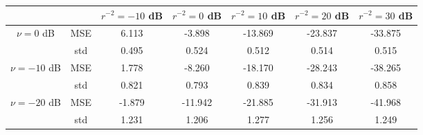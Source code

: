 \begin{tabular}{ccccccc}
\toprule
             &     &  $r^{-2}=-10$ dB &  $r^{-2}=0$ dB &  $r^{-2}=10$ dB &  $r^{-2}=20$ dB &  $r^{-2}=30$ dB \\
\midrule
$\nu=0$ dB & MSE &            6.113 &         -3.898 &         -13.869 &         -23.837 &         -33.875 \\
             & std &            0.495 &          0.524 &           0.512 &           0.514 &           0.515 \\ \hline
$\nu=-10$ dB & MSE &            1.778 &         -8.260 &         -18.170 &         -28.243 &         -38.265 \\
             & std &            0.821 &          0.793 &           0.839 &           0.834 &           0.858 \\ \hline
$\nu=-20$ dB & MSE &           -1.879 &        -11.942 &         -21.885 &         -31.913 &         -41.968 \\
             & std &            1.231 &          1.206 &           1.277 &           1.256 &           1.249 \\
\bottomrule
\end{tabular}

